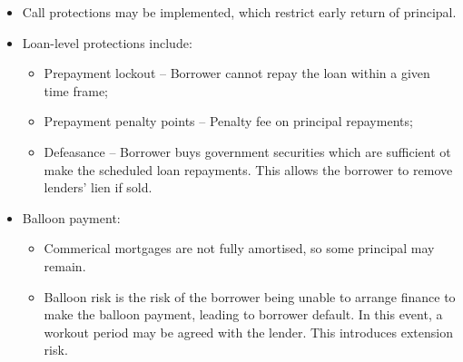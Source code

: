 \documentclass[../notes_compiled.tex]{subfiles}
\begin{document}
\begin{itemize}
\item Call protections may be implemented, which restrict early return of principal.
\item Loan-level protections include:
\begin{itemize}
\item Prepayment lockout -- Borrower cannot repay the loan within a given time frame;
\item Prepayment penalty points -- Penalty fee on principal repayments;
\item Defeasance -- Borrower buys government securities which are sufficient ot make the scheduled loan repayments. This allows the borrower to remove lenders’ lien if sold.
\end{itemize}
\item Balloon payment:
\begin{itemize}
\item Commerical mortgages are not fully amortised, so some principal may remain.
\item Balloon risk is the risk of the borrower being unable to arrange finance to make the balloon payment, leading to borrower default. In this event, a workout period may be agreed with the lender. This introduces extension risk.
\end{itemize}
\end{itemize}
\end{document}
